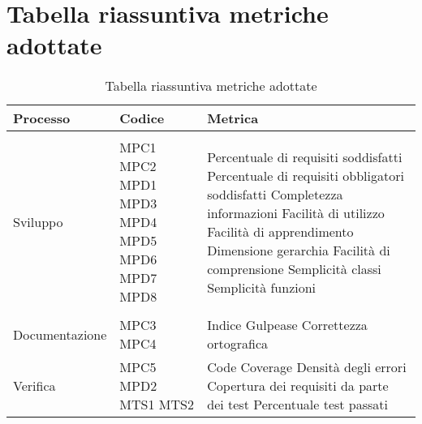 \section{Tabella riassuntiva metriche adottate}{

\centering
\renewcommand{\arraystretch}{2}
\begin{longtable}{C{3cm} C{2cm} C{9.7cm}}
\caption{Tabella riassuntiva metriche adottate}\\
\textbf{Processo} &
\textbf{Codice}&
\textbf{Metrica}\\
\endhead

\\

Sviluppo & MPC1 \newline MPC2 \newline MPD1  \newline MPD3 \newline MPD4 \newline MPD5 \newline MPD6 \newline MPD7 \newline MPD8 & Percentuale di requisiti soddisfatti \newline Percentuale di requisiti obbligatori soddisfatti \newline Completezza informazioni \newline Facilità di utilizzo \newline Facilità di apprendimento \newline Dimensione gerarchia \newline Facilità di comprensione \newline Semplicità classi \newline Semplicità funzioni
\\






\\
Documentazione & MPC3 \newline MPC4 & Indice Gulpease \newline  Correttezza ortografica
\\
Verifica & MPC5 \newline MPD2 \newline MTS1 \newline MTS2 & Code Coverage \newline Densità degli errori \newline Copertura dei requisiti da parte dei test \newline Percentuale test passati
\\








\end{longtable}}
